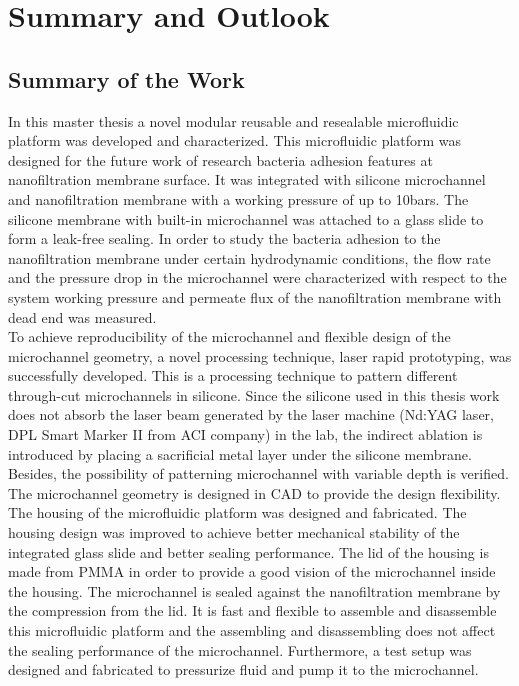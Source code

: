 \chapter{Summary and Outlook}
\label{5}
\section{Summary of the Work}
\label{5_1}
In this master thesis a novel modular reusable and resealable microfluidic platform was developed and characterized. This microfluidic platform was designed for the future work of research bacteria adhesion features at nanofiltration membrane surface. It was integrated with silicone microchannel and nanofiltration membrane with a working pressure of up to 10bars. The silicone membrane with built-in microchannel was attached to a glass slide to form a leak-free sealing. In order to study the bacteria adhesion to the nanofiltration membrane under certain hydrodynamic conditions, the flow rate and the pressure drop in the microchannel were characterized with respect to the system working pressure and permeate flux of the nanofiltration membrane with dead end was measured.\\

To achieve reproducibility of the microchannel and flexible design of the microchannel geometry, a novel processing technique, laser rapid prototyping, was successfully developed. This is a processing technique to pattern different through-cut microchannels in silicone. Since the silicone used in this thesis work does not absorb the laser beam generated by the laser machine (Nd:YAG laser, DPL Smart Marker II from ACI company) in the lab, the indirect ablation is introduced by placing a sacrificial metal layer under the silicone membrane. Besides, the possibility of patterning microchannel with variable depth is verified. The microchannel geometry is designed in CAD to provide the design flexibility. \\

The housing of the microfluidic platform was designed and fabricated. The housing design was improved to achieve better mechanical stability of the integrated glass slide and better sealing performance. The lid of the housing is made from PMMA in order to provide a good vision of the microchannel inside the housing. The microchannel is sealed against the nanofiltration membrane by the compression from the lid. It is fast and flexible to assemble and disassemble this microfluidic platform and the assembling and disassembling does not affect the sealing performance of the microchannel. Furthermore, a test setup was designed and fabricated to pressurize fluid and pump it to the microchannel.\\

